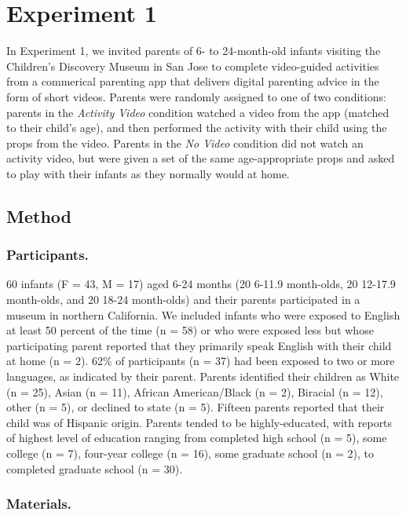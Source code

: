 \documentclass[man,floatsintext]{apa6}
\begin{document}
\hypertarget{experiment-1}{%
\section{Experiment 1}\label{experiment-1}}

In Experiment 1, we invited parents of 6- to 24-month-old infants visiting the Children's Discovery Museum in San Jose to complete video-guided activities from a commerical parenting app that delivers digital parenting advice in the form of short videos.
Parents were randomly assigned to one of two conditions: parents in the \emph{Activity Video} condition watched a video from the app (matched to their child's age), and then performed the activity with their child using the props from the video.
Parents in the \emph{No Video} condition did not watch an activity video, but were given a set of the same age-appropriate props and asked to play with their infants as they normally would at home.

\hypertarget{method}{%
\subsection{Method}\label{method}}

\hypertarget{participants.}{%
\subsubsection{Participants.}\label{participants.}}

60 infants (F = 43, M = 17) aged 6-24 months (20 6-11.9 month-olds, 20 12-17.9 month-olds, and 20 18-24 month-olds) and their parents participated in a museum in northern California.
We included infants who were exposed to English at least 50 percent of the time (n = 58) or who were exposed less but whose participating parent reported that they primarily speak English with their child at home (n = 2).
62\% of participants (n = 37) had been exposed to two or more languages, as indicated by their parent.
Parents identified their children as White (n = 25), Asian (n = 11), African American/Black (n = 2), Biracial (n = 12), other (n = 5), or declined to state (n = 5).
Fifteen parents reported that their child was of Hispanic origin.
Parents tended to be highly-educated, with reports of highest level of education ranging from completed high school (n = 5), some college (n = 7), four-year college (n = 16), some graduate school (n = 2), to completed graduate school (n = 30).

\hypertarget{materials.}{%
\subsubsection{Materials.}\label{materials.}}
\end{document}
